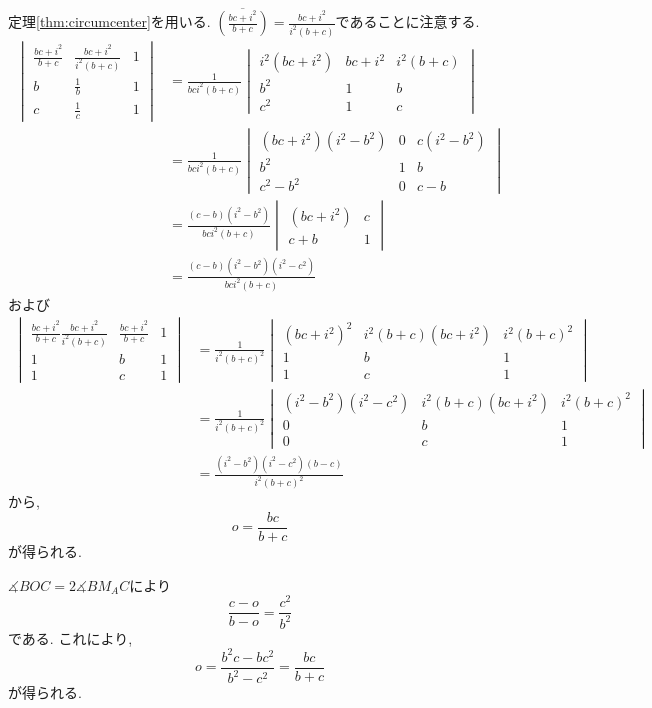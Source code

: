 \begin{prf*}
定理\ref{thm:circumcenter}を用いる.
$\overline{(\frac{bc+i^2}{b+c})}=\frac{bc+i^2}{i^2(b+c)}$であることに注意する.
\begin{align*}
\begin{vmatrix}
\frac{bc+i^2}{b+c}&\frac{bc+i^2}{i^2(b+c)}&1\\
b&\frac 1b&1\\
c&\frac 1c&1
\end{vmatrix}
&=\frac 1{bci^2(b+c)}
\begin{vmatrix}
i^2(bc+i^2)&bc+i^2&i^2(b+c)\\
b^2&1&b\\
c^2&1&c
\end{vmatrix}\\
&=\frac 1{bci^2(b+c)}
\begin{vmatrix}
(bc+i^2)(i^2-b^2)&0&c(i^2-b^2)\\
b^2&1&b\\
c^2-b^2&0&c-b
\end{vmatrix}\\
&=\frac{(c-b)(i^2-b^2)}{bci^2(b+c)}
\begin{vmatrix}
(bc+i^2)&c\\
c+b&1
\end{vmatrix}\\
&=\frac{(c-b)(i^2-b^2)(i^2-c^2)}{bci^2(b+c)}
\end{align*}
および
\begin{align*}
\begin{vmatrix}
\frac{bc+i^2}{b+c}\frac{bc+i^2}{i^2(b+c)}&\frac{bc+i^2}{b+c}&1\\
1&b&1\\
1&c&1
\end{vmatrix}
&=\frac 1{i^2(b+c)^2}
\begin{vmatrix}
(bc+i^2)^2&i^2(b+c)(bc+i^2)&i^2(b+c)^2\\
1&b&1\\
1&c&1
\end{vmatrix}\\
&=\frac 1{i^2(b+c)^2}
\begin{vmatrix}
(i^2-b^2)(i^2-c^2)&i^2(b+c)(bc+i^2)&i^2(b+c)^2\\
0&b&1\\
0&c&1
\end{vmatrix}\\
&=\frac{(i^2-b^2)(i^2-c^2)(b-c)}{i^2(b+c)^2}
\end{align*}
から,
\[o=\frac{bc}{b+c}\]
が得られる.
\end{prf*}
\begin{prff*}
$\measuredangle BOC=2\measuredangle BM_AC$により
\[\frac{c-o}{b-o}=\frac{c^2}{b^2}\]
である.
これにより,
\[o=\frac{b^2c-bc^2}{b^2-c^2}=\frac{bc}{b+c}\]
が得られる.
\end{prff*}
%
%